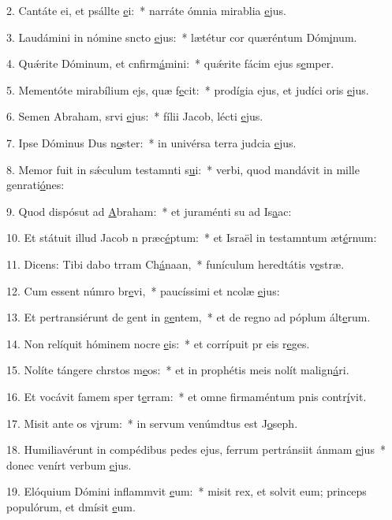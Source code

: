 2. Cantáte ei, et psállte \uline{e}i:~* narráte ómnia mirablia \uline{e}jus.\par 
3. Laudámini in nómine sncto \uline{e}jus:~* lætétur cor quæréntum Dóm\uline{i}num.\par 
4. Quǽrite Dóminum, et cnfirm\uline{á}mini:~* quǽrite fácim ejus s\uline{e}mper.\par 
5. Mementóte mirabílium ejs, quæ f\uline{e}cit:~* prodígia ejus, et judíci oris \uline{e}jus.\par 
6. Semen Abraham, srvi \uline{e}jus:~* fílii Jacob, lécti \uline{e}jus.\par 
7. Ipse Dóminus Dus n\uline{o}ster:~* in univérsa terra judcia \uline{e}jus.\par 
8. Memor fuit in sǽculum testamnti s\uline{u}i:~* verbi, quod mandávit in mille genrati\uline{ó}nes:\par 
9. Quod dispósut ad \uline{A}braham:~* et juraménti su ad Is\uline{a}ac:\par 
10. Et státuit illud Jacob n præc\uline{é}ptum:~* et Israël in testamntum æt\uline{é}rnum:\par 
11. Dicens: Tibi dabo trram Ch\uline{á}naan,~* funículum heredtátis v\uline{e}stræ.\par 
12. Cum essent númro br\uline{e}vi,~* paucíssimi et ncolæ \uline{e}jus:\par 
13. Et pertransiérunt de gent in g\uline{e}ntem,~* et de regno ad póplum ált\uline{e}rum.\par 
14. Non relíquit hóminem nocre \uline{e}is:~* et corrípuit pr eis r\uline{e}ges.\par 
15. Nolíte tángere chrstos m\uline{e}os:~* et in prophétis meis nolít malign\uline{á}ri.\par 
16. Et vocávit famem sper t\uline{e}rram:~* et omne firmaméntum pnis contr\uline{í}vit.\par 
17. Misit ante os v\uline{i}rum:~* in servum venúmdtus est J\uline{o}seph.\par 
18. Humiliavérunt in compédibus pedes ejus, ferrum pertránsiit ánmam \uline{e}jus~* donec venírt verbum \uline{e}jus.\par 
19. Elóquium Dómini inflammvit \uline{e}um:~* misit rex, et solvit eum; princeps populórum, et dmísit \uline{e}um.\par 
